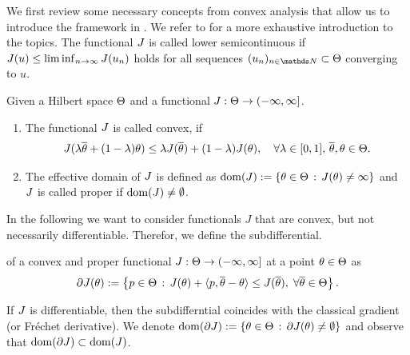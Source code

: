 We first review some necessary concepts from convex analysis that allow us to introduce the framework in \cite{bungert2022bregman}. We refer to \cite{benning2018modern, rockafellar1997convex, bauschke2011convex} for a more exhaustive introduction to the topics.
%
The functional $J$ is called lower semicontinuous if $J(u)\leq\liminf_{n\to\infty}J(u_n)$ holds for all sequences $(u_n)_{n\in\N}\subset\Param$ converging to $u$.
%
\begin{definition}{}{}
	Given a Hilbert space $\Theta$ and a functional $J:\Theta\to(-\infty,\infty]$.
	\begin{enumerate}
		\item The functional $J$ is called convex, if
		\begin{align}
			J(\lambda\overline{\theta}+(1-\lambda)\theta)\leq
			\lambda J(\overline{\theta})
			+(1-\lambda)J(\theta),\quad\forall\lambda\in[0,1],\,\overline{\theta},\theta\in\Theta.
		\end{align}
		\item The effective domain of $J$ is defined as $\operatorname{dom}(J):=\{\theta\in\Theta\,:\,J(\theta)\neq\infty\}$ and $J$ is called proper if $\operatorname{dom}(J)\neq\emptyset$.
	\end{enumerate} 
\end{definition}
%
%
In the following we want to consider functionals $J$ that are convex, but not necessarily differentiable. Therefor, we define the subdifferential.
%
\begin{definition}{}{}
	of a convex {and proper} functional $J:\Theta\to(-\infty,\infty]$ at a point $\theta\in\Theta$ as
	\begin{align}
		\label{eq:subgrad}
		\partial J(\theta) := \left\lbrace p\in\Theta \,:\, J(\theta) + \langle p,\overline{\theta}-\theta \rangle \leq J(\overline{\theta}),\;\forall\overline{\theta}\in\Theta\right\rbrace.
	\end{align}
\end{definition}
If $J$ is differentiable, then the subdifferntial coincides with the classical gradient (or Fr\'echet derivative). We denote $\operatorname{dom}(\partial J):=\{\theta\in\Theta\,:\,\partial J(\theta)\neq\emptyset\}$ and observe that $\operatorname{dom}(\partial J)\subset\operatorname{dom}(J)$.

